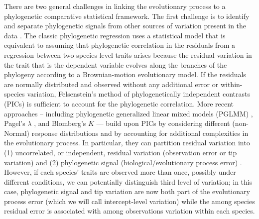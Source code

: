 \documentclass[12pt]{article}
\begin{document}
There are two general challenges in linking the evolutionary process to a phylogenetic comparative statistical framework.
The first challenge is to identify and separate phylogenetic signals from other sources of variation present in the data \citep{blomberg2003testing}.  
The classic phylogenetic regression uses a statistical model that is equivalent to assuming that phylogenetic correlation in the residuals from a regression between two species-level traits arises because the residual variation in the trait that is the dependent variable evolves along the branches of the phylogeny according to a Brownian-motion evolutionary model. 
If the residuals are normally distributed and observed without any additional error or within-species variation, Felsenstein's method of phylogenetically independent contrasts (PICs) \citep{felsenstein1985phylogenies, nicolakakis2000forebrain} is sufficient to account for the phylogenetic correlation.
More recent approaches -- including phylogenetic generalized linear mixed models (PGLMM) \citep{ives2011generalized}, Pagel's $\lambda$ \citep{pagel1999inferring}, and Blomberg's $K$ \citep{blomberg2003testing} --- build upon PICs by considering different (non-Normal) response distributions and by accounting for additional complexities in the evolutionary process. 
In particular, they can partition residual variation into (1) uncorrelated, or independent, residual variation (observation error or tip variation) and (2) phylogenetic signal  (biological/evolutionary process error) \citep{hansen2012interpreting}.
However, if each species' traits are observed more than once, possibly under different conditions, we can potentially distinguish third level of variation; in this case, phylogenetic signal and tip variation are now both part of the evolutionary process error (which we will call intercept-level variation) while the among species residual error is associated with among observations variation within each species.
\end{document}
